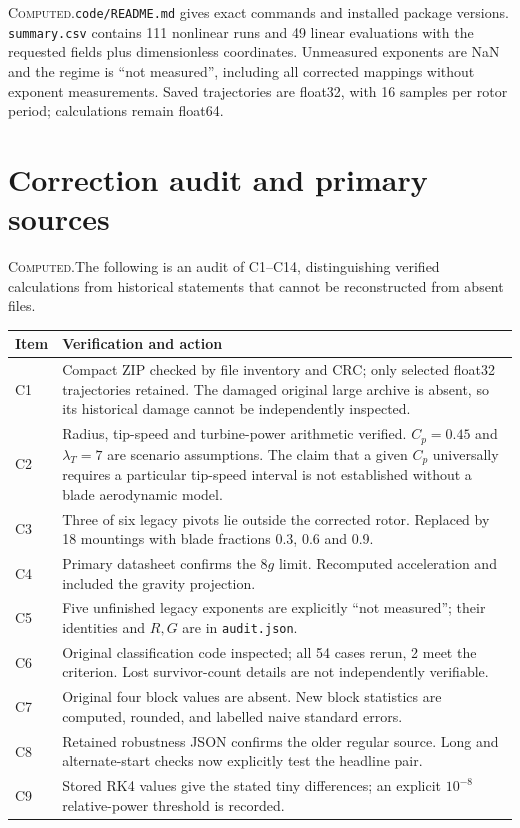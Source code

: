 \documentclass[10pt,a4paper]{article}
\newcommand{\C}{\textcolor{accent}{\textsc{Computed.}}\enspace}
\newcommand{\page}[1]{\clearpage\section{#1}}
\begin{document}
\C \texttt{code/README.md} gives exact commands and installed package versions. \texttt{summary.csv} contains 111 nonlinear runs and 49 linear evaluations with the requested fields plus dimensionless coordinates. Unmeasured exponents are NaN and the regime is ``not measured'', including all corrected mappings without exponent measurements. Saved trajectories are float32, with 16 samples per rotor period; calculations remain float64.

\page{Correction audit and primary sources}
\C The following is an audit of C1--C14, distinguishing verified calculations from historical statements that cannot be reconstructed from absent files.
\renewcommand{\arraystretch}{1.22}
\par\medskip\noindent\begin{tabularx}{\textwidth}{@{}lX@{}}\toprule
Item&Verification and action\\\midrule
C1&Compact ZIP checked by file inventory and CRC; only selected float32 trajectories retained. The damaged original large archive is absent, so its historical damage cannot be independently inspected.\\
C2&Radius, tip-speed and turbine-power arithmetic verified. $C_p=0.45$ and $\lambda_T=7$ are scenario assumptions. The claim that a given $C_p$ universally requires a particular tip-speed interval is not established without a blade aerodynamic model.\\
C3&Three of six legacy pivots lie outside the corrected rotor. Replaced by 18 mountings with blade fractions 0.3, 0.6 and 0.9.\\
C4&Primary datasheet confirms the 8$g$ limit. Recomputed acceleration and included the gravity projection.\\
C5&Five unfinished legacy exponents are explicitly ``not measured''; their identities and $R,G$ are in \texttt{audit.json}.\\
C6&Original classification code inspected; all 54 cases rerun, 2 meet the criterion. Lost survivor-count details are not independently verifiable.\\
C7&Original four block values are absent. New block statistics are computed, rounded, and labelled naive standard errors.\\
C8&Retained robustness JSON confirms the older regular source. Long and alternate-start checks now explicitly test the headline pair.\\
C9&Stored RK4 values give the stated tiny differences; an explicit $10^{-8}$ relative-power threshold is recorded.\\

\end{tabularx}
\end{document}

